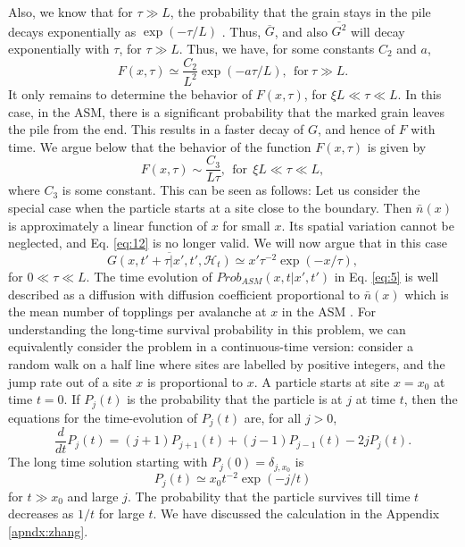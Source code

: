 \documentclass[11pt,a4paper]{book}
\begin{document}
Also, we know that for $\tau \gg L$, the probability that the grain 
stays in the pile decays exponentially as $\exp( -\tau/L)$ \cite{punya}.
Thus, $\overline{G}$, and also $\overline{G^2}$ will decay exponentially 
with $\tau$, for $\tau \gg L$. Thus, we have, for some constants $C_2$ and 
$a$,
\begin{equation}
  F(x,\tau) \simeq \frac{C_2}{L^2} \exp( - a \tau/L), \mathrm{~~for~} \tau \gg L.
\end{equation}
It only remains to determine the behavior of $ F(x,\tau)$, for $\xi L 
\ll \tau \ll L$.   In this 
case, in the ASM, there is a significant probability that the marked 
grain leaves 
the pile from the end. This results in a faster decay of $G$, and hence 
of $F$ with time.   We argue below that the behavior of the function 
$F(x,\tau)$ is 
given by
\begin{equation}
  F(x,\tau) \sim \frac{C_3}{L\tau}, \mathrm{~~for~~} \xi L  \ll \tau \ll L,
\end{equation}
where $C_3$ is some constant.
 This can be seen as follows:  Let us consider 
the special case when the particle starts at a site close to the boundary. 
Then $\bar{n}(x)$ is approximately a linear function of $x$ 
for small $x$. Its spatial variation cannot be neglected, and Eq. \eqref{eq:12} is 
no longer valid.  We 
will now argue that  in this case
\begin{equation}
  \overline{G(x,t' + \tau |x', t',\mathcal{H}_t)} \simeq x' \tau^{-2} \exp( -x/ \tau),
\end{equation}
for $0\ll \tau \ll L$. The time evolution of $Prob_{ASM}(x,t|x',t')$
in Eq. \eqref{eq:5} is well described as a diffusion
with diffusion coefficient proportional to $\bar{n}(x)$ which is the mean
number of topplings per avalanche at $x$ in the ASM \cite{punya}.
For understanding the long-time survival probability in this problem, we 
can equivalently  consider  the problem in a continuous-time version: 
consider a  random walk on 
a half line where sites are labelled by positive integers, and the jump 
rate out of a site $x$ is proportional to $x$. A particle starts at site 
$x =x_0$ at time $t=0$. If $P_j(t)$ is the probability that the particle is 
at $j$ at time $t$, then the equations for the time-evolution of $P_j(t)$ 
are, for all $ j>0$,
\begin{equation}
  \label{eq:18}
\frac{d}{dt} P_j(t) = (j+1) P_{j+1}(t) +(j-1) P_{j-1}(t) - 2j 
P_j(t).
\end{equation}
The long time solution starting with $P_j(0) = \delta_{j,x_0}$ is 
\begin{equation}
  P_j(t) \simeq x_0 t^{-2} \exp(- j/t)
\end{equation}
for $t \gg x_0$ and large $j$. The 
probability that the particle survives till time $t$ decreases as $1/t$ 
for large $t$. We have discussed the calculation in the Appendix
\ref{apndx:zhang}. 
\end{document}
